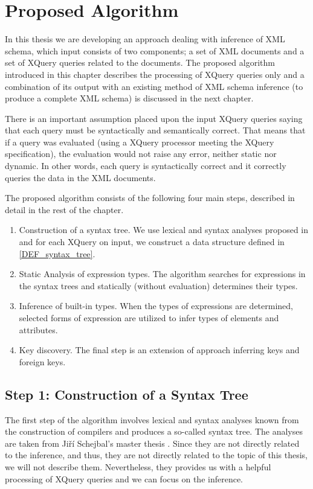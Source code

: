 \chapter{Proposed Algorithm} \label{CHAPTER_proposed_algorithm}
In this thesis we are developing an approach dealing with inference of XML schema, which input consists of two components; a set of XML documents and a set of XQuery queries related to the documents. The proposed algorithm introduced in this chapter describes the processing of XQuery queries only and a combination of its output with an existing method of XML schema inference (to produce a complete XML schema) is discussed in the next chapter.

There is an important assumption placed upon the input XQuery queries saying that each query must be syntactically and semantically correct. That means that if a query was evaluated (using a XQuery processor meeting the XQuery specification), the evaluation would not raise any error, neither static nor dynamic. In other words, each query is syntactically correct and it correctly queries the data in the XML documents.

The proposed algorithm consists of the following four main steps, described in detail in the rest of the chapter.

\begin{enumerate}
\item Construction of a syntax tree. We use lexical and syntax analyses proposed in \cite{thesis_schejbal} and for each XQuery on input, we construct a data structure defined in \ref{DEF_syntax_tree}.
\item Static Analysis of expression types. The algorithm searches for expressions in the syntax trees and statically (without evaluation) determines their types.
\item Inference of built-in types. When the types of expressions are determined, selected forms of expression are utilized to infer types of elements and attributes.
\item Key discovery. The final step is an extension of approach \cite{Necasky:2009:DXK:1529282.1529414} inferring keys and foreign keys.
\end{enumerate}

\section{Step 1: Construction of a Syntax Tree}
The first step of the algorithm involves lexical and syntax analyses known from the construction of compilers and produces a so-called syntax tree. The analyses are taken from Ji\v r\'{i} Schejbal's master thesis \cite{thesis_schejbal}. Since they are not directly related to the inference, and thus, they are not directly related to the topic of this thesis, we will not describe them. Nevertheless, they provides us with a helpful processing of XQuery queries and we can focus on the inference.

